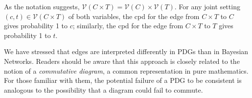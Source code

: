 \documentclass[letterpaper]{article} %
\theoremstyle{plain}
\theoremstyle{definition}
\theoremstyle{remark}
\newcommand{\V}{\mathcal V}
\begin{document}
\begin{constr}
As the notation suggests, $\V( C \times T) = \V(C) \times \V(T)$.
For any joint setting $(c,t) \in \V(C \times T)$ of both variables, the cpd for
the edge from $C \times T$ to $C$ gives probability 1 to $c$;
similarly, the cpd for the edge from $ C \times T$ to $T$ gives probability 1 to $t$.
\end{constr}

\begin{vfull}
    We have stressed that edges are interpreted differently in PDGs than
    in Bayesian Networks. Readers should be aware that this approach is
    closely related to the notion of a \emph{commutative diagram}, a
    common representation in pure mathematics. For those familiar with
    them, the potential failure of a PDG to be consistent is analogous to
    the possibility that a diagram could fail to commute. 
\end{vfull}
\end{document}
